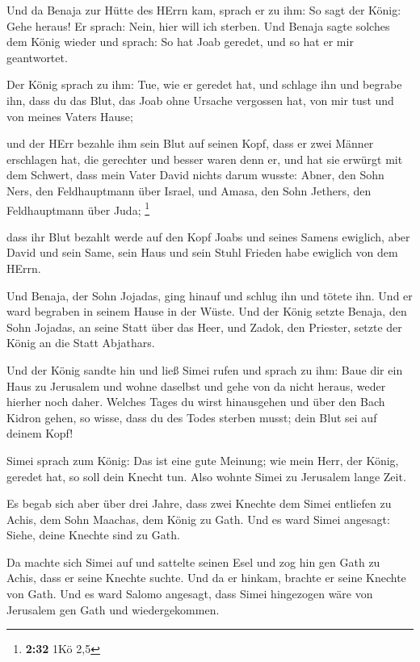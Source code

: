  Und da Benaja zur Hütte des HErrn kam, sprach er zu ihm:
So sagt der König: Gehe heraus! Er sprach: Nein, hier will ich sterben.
Und Benaja sagte solches dem König wieder und sprach: So hat Joab
geredet, und so hat er mir geantwortet.

 Der König sprach zu ihm: Tue, wie er geredet hat, und
schlage ihn und begrabe ihn, dass du das Blut, das Joab ohne Ursache
vergossen hat, von mir tust und von meines Vaters Hause;

 und der HErr bezahle ihm sein Blut auf seinen Kopf, dass
er zwei Männer erschlagen hat, die gerechter und besser waren denn er,
und hat sie erwürgt mit dem Schwert, dass mein Vater David nichts darum
wusste: Abner, den Sohn Ners, den Feldhauptmann über Israel, und Amasa,
den Sohn Jethers, den Feldhauptmann über Juda; \footnote{\textbf{2:32}
  1Kö 2,5}

 dass ihr Blut bezahlt werde auf den Kopf Joabs und seines
Samens ewiglich, aber David und sein Same, sein Haus und sein Stuhl
Frieden habe ewiglich von dem HErrn.

 Und Benaja, der Sohn Jojadas, ging hinauf und schlug ihn
und tötete ihn. Und er ward begraben in seinem Hause in der Wüste.
 Und der König setzte Benaja, den Sohn Jojadas, an seine
Statt über das Heer, und Zadok, den Priester, setzte der König an die
Statt Abjathars.

 Und der König sandte hin und ließ Simei rufen und sprach
zu ihm: Baue dir ein Haus zu Jerusalem und wohne daselbst und gehe von
da nicht heraus, weder hierher noch daher.  Welches Tages
du wirst hinausgehen und über den Bach Kidron gehen, so wisse, dass du
des Todes sterben musst; dein Blut sei auf deinem Kopf!

 Simei sprach zum König: Das ist eine gute Meinung; wie
mein Herr, der König, geredet hat, so soll dein Knecht tun. Also wohnte
Simei zu Jerusalem lange Zeit.

 Es begab sich aber über drei Jahre, dass zwei Knechte dem
Simei entliefen zu Achis, dem Sohn Maachas, dem König zu Gath. Und es
ward Simei angesagt: Siehe, deine Knechte sind zu Gath.

 Da machte sich Simei auf und sattelte seinen Esel und zog
hin gen Gath zu Achis, dass er seine Knechte suchte. Und da er hinkam,
brachte er seine Knechte von Gath.  Und es ward Salomo
angesagt, dass Simei hingezogen wäre von Jerusalem gen Gath und
wiedergekommen.

